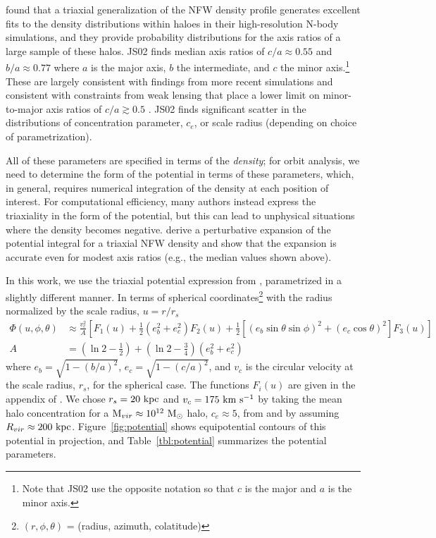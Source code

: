 \documentclass[letterpaper,12pt,preprint]{aastex}
\newcommand{\msun}{\ensuremath{\mathrm{M}_\odot}}
\begin{document}
 \citet[][hereafter JS02]{jing02} found that a triaxial generalization of the NFW density profile \citep{navarro96} generates excellent fits to the density distributions within haloes in their high-resolution N-body simulations, and they provide probability distributions for the axis ratios of a large sample of these halos. JS02 finds median axis ratios of $c/a \approx 0.55$ and $b/a \approx 0.77$ where $a$ is the major axis, $b$ the intermediate, and $c$ the minor axis.\footnote{Note that JS02 use the opposite notation so that $c$ is the major and $a$ is the minor axis.} These are largely consistent with findings from more recent simulations \citep[e.g.,][]{millenium, hmm, butsky15} and consistent with constraints from weak lensing that place a lower limit on minor-to-major axis ratios of $c/a\gtrsim0.5$ \citep{vanuitert12}. JS02 finds significant scatter in the distributions of concentration parameter, $c_e$, or scale radius (depending on choice of parametrization). 

All of these parameters are specified in terms of the \emph{density}; for orbit analysis, we need to determine the form of the potential in terms of these parameters, which, in general, requires numerical integration of the density at each position of interest. For computational efficiency, many authors instead express the triaxiality in the form of the potential, but this can lead to unphysical situations where the density becomes negative. \citet{leesuto03} derive a perturbative expansion of the potential integral for a triaxial NFW density and show that the expansion is accurate even for modest axis ratios (e.g., the median values shown above). 

In this work, we use the triaxial potential expression from \citet{leesuto03}, parametrized in a slightly different manner. In terms of spherical coordinates\footnote{$(r,\phi,\theta)$ = (radius, azimuth, colatitude)} with the radius normalized by the scale radius, $u = r/r_s$
\begin{align}
	\Phi(u,\phi,\theta) &\approx \frac{v_c^2}{A}\left[F_1(u) + \frac{1}{2}(e_b^2 + e_c^2)F_2(u) + \frac{1}{2} [(e_b\sin\theta \sin\phi)^2 + (e_c\cos\theta)^2] F_3(u) \right]\label{eq:potential}\\
	A &= \left(\ln2 - \frac{1}{2}\right) + \left(\ln2-\frac{3}{4}\right) (e_b^2 + e_c^2)
\end{align}
where $e_b = \sqrt{1 - (b/a)^2}$, $e_c = \sqrt{1 - (c/a)^2}$, and $v_c$ is the circular velocity at the scale radius, $r_s$, for the spherical case. The functions $F_i(u)$ are given in the appendix of \cite{leesuto03}. We chose $r_s=20~{\rm kpc}$ and $v_c = 175~{\rm km}~{\rm s}^{-1}$ by taking the mean halo concentration for a ${\rm M}_{vir} \approx 10^{12}~\msun$ halo, $c_e\approx5$, from \cite{jing02} and by assuming $R_{vir}\approx200~{\rm kpc}$. Figure~\ref{fig:potential} shows equipotential contours of this potential in projection, and Table~\ref{tbl:potential} summarizes the potential parameters.
\end{document}
